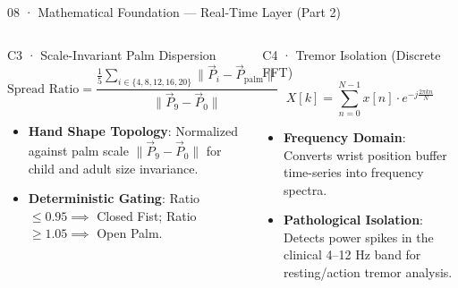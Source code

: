 \documentclass[aspectratio=169,11pt]{beamer}
\begin{document}
\begin{frame}{08 · Mathematical Foundation — Real-Time Layer (Part 2)}
\begin{columns}[T]
\begin{block}{C3 · Scale-Invariant Palm Dispersion}
$$\text{Spread Ratio} = \frac{\frac{1}{5}\sum_{i \in \{4,8,12,16,20\}} \|\vec{P}_i - \vec{P}_{\text{palm}}\|}{\|\vec{P}_9 - \vec{P}_0\|}$$
\begin{itemize}
    \setlength{\itemsep}{2pt}
    \item \textbf{Hand Shape Topology}: Normalized against palm scale $\|\vec{P}_9 - \vec{P}_0\|$ for child and adult size invariance.
    \item \textbf{Deterministic Gating}: Ratio $\le 0.95 \implies$ Closed Fist; Ratio $\ge 1.05 \implies$ Open Palm.
\end{itemize}
\end{block}

\begin{block}{C4 · Tremor Isolation (Discrete FFT)}
$$X[k] = \sum_{n=0}^{N-1} x[n] \cdot e^{-j \frac{2\pi kn}{N}}$$
\begin{itemize}
    \setlength{\itemsep}{2pt}
    \item \textbf{Frequency Domain}: Converts wrist position buffer time-series into frequency spectra.
    \item \textbf{Pathological Isolation}: Detects power spikes in the clinical 4--12 Hz band for resting/action tremor analysis.
\end{itemize}
\end{block}
\end{columns}
\end{frame}
\end{document}
